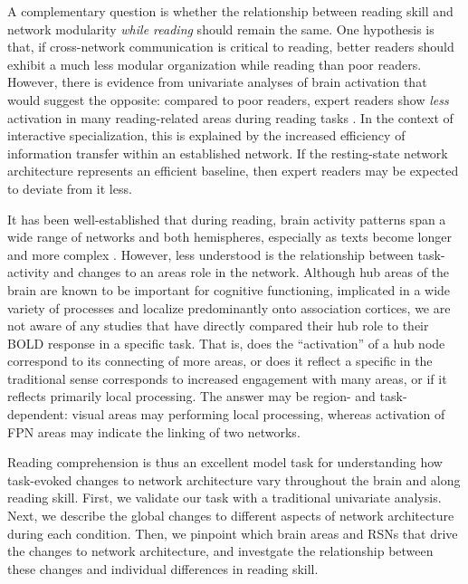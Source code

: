 A complementary question is whether the relationship between reading skill and network modularity \textit{while reading} should remain the same. One hypothesis is that, if cross-network communication is critical to reading, better readers should exhibit a much less modular organization while reading than poor readers. However, there is evidence from univariate analyses of brain activation that would suggest the opposite: compared to poor readers, expert readers show \textit{less} activation in many reading-related areas during reading tasks \citep{Christodoulou2014}. In the context of interactive specialization, this is explained by the increased efficiency of information transfer within an established network. If the resting-state network architecture represents an efficient baseline, then expert readers may be expected to deviate from it less.

It has been well-established that during reading, brain activity patterns span a wide range of networks and both hemispheres, especially as texts become longer and more complex \citep{Rimrodt2009, Xu2006}. However, less understood is the relationship between task-activity and changes to an areas role in the network. Although hub areas of the brain are known to be important for cognitive functioning, implicated in a wide variety of processes and localize predominantly onto association cortices, we are not aware of any studies that have directly compared their hub role to their BOLD response in a specific task. That is, does the ``activation'' of a hub node correspond to its connecting of more areas, or does it reflect a specific in the traditional sense corresponds to increased engagement with many areas, or if it reflects primarily local processing. The answer may be region- and task-dependent: visual areas may performing local processing, whereas activation of FPN areas may indicate the linking of two networks. 

Reading comprehension is thus an excellent model task for understanding how task-evoked changes to network architecture vary throughout the brain and along reading skill. First, we validate our task with a traditional univariate analysis. Next, we describe the global changes to different aspects of network architecture during each condition. Then, we pinpoint which brain areas and RSNs that drive the changes to network architecture, and investgate the relationship between these changes and individual differences in reading skill. 



